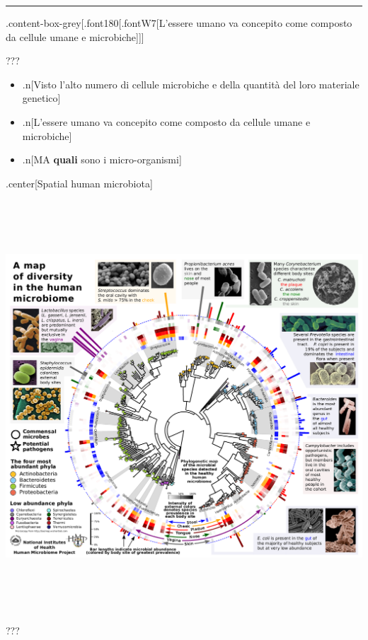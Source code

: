 \documentclass[
]{article}
\begin{document}
\begin{center}\rule{0.5\linewidth}{0.5pt}\end{center}

.content-box-grey{[}.font180{[}.fontW7{[}L'essere umano va concepito
come composto da cellule umane e microbiche{]}{]}{]}

???

\begin{itemize}
\item
  .n{[}Visto l'alto numero di cellule microbiche e della quantità del
  loro materiale genetico{]}
\item
  .n{[}L'essere umano va concepito come composto da cellule umane e
  microbiche{]}
\item
  .n{[}MA \textbf{quali} sono i micro-organismi{]}
\end{itemize}

.center{[}Spatial human microbiota{]}

\begin{center}\includegraphics[width=750px,height=580px]{images/humanDiversity} \end{center}

???
\end{document}
